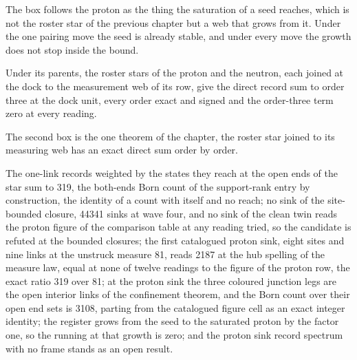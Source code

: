 The box follows the proton as the thing the saturation of a seed reaches, which is not the roster star of the previous chapter but a web that grows from it. Under the one pairing move the seed is already stable, and under every move the growth does not stop inside the bound.
\begin{chconditional}\label{box:VII-4-proton-as-a-seeded-sink:2}
Under its parents, the roster stars of the proton and the neutron, each joined at the dock to the measurement web of its row, give the direct record sum to order three at the dock unit, every order exact and signed and the order-three term zero at every reading.
\end{chconditional}
The second box is the one theorem of the chapter, the roster star joined to its measuring web has an exact direct sum order by order.
\begin{chwall}\label{box:VII-4-proton-as-a-seeded-sink:3}
The one-link records weighted by the states they reach at the open ends of the star sum to 319, the both-ends Born count of the support-rank entry by construction, the identity of a count with itself and no reach; no sink of the site-bounded closure, 44341 sinks at wave four, and no sink of the clean twin reads the proton figure of the comparison table at any reading tried, so the candidate is refuted at the bounded closures; the first catalogued proton sink, eight sites and nine links at the unstruck measure 81, reads 2187 at the hub spelling of the measure law, equal at none of twelve readings to the figure of the proton row, the exact ratio 319 over 81; at the proton sink the three coloured junction legs are the open interior links of the confinement theorem, and the Born count over their open end sets is 3108, parting from the catalogued figure cell as an exact integer identity; the register grows from the seed to the saturated proton by the factor one, so the running at that growth is zero; and the proton sink record spectrum with no frame stands as an open result.
\end{chwall}
